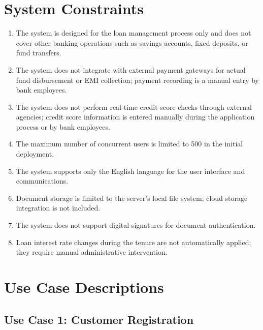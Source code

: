 \section{System Constraints}

\begin{enumerate}
  \item The system is designed for the loan management process only and does not cover other banking operations such as savings accounts, fixed deposits, or fund transfers.
  \item The system does not integrate with external payment gateways for actual fund disbursement or EMI collection; payment recording is a manual entry by bank employees.
  \item The system does not perform real-time credit score checks through external agencies; credit score information is entered manually during the application process or by bank employees.
  \item The maximum number of concurrent users is limited to 500 in the initial deployment.
  \item The system supports only the English language for the user interface and communications.
  \item Document storage is limited to the server's local file system; cloud storage integration is not included.
  \item The system does not support digital signatures for document authentication.
  \item Loan interest rate changes during the tenure are not automatically applied; they require manual administrative intervention.
\end{enumerate}

\section{Use Case Descriptions}

\subsection{Use Case 1: Customer Registration}

